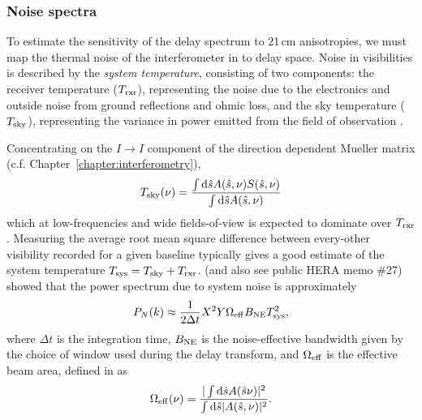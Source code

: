 \subsubsection{Noise spectra}

To estimate the sensitivity of the delay spectrum to 21\,cm anisotropies, we must map the thermal noise of the interferometer in to delay space. Noise in visibilities is described by the \textit{system temperature}, consisting of two components: the receiver temperature ($T_{\rm rxr}$), representing the noise due to the electronics and outside noise from ground reflections and ohmic loss, and the sky temperature ($T_{\rm sky}$), representing the variance in power emitted from the field of observation \citep{TMS}.

Concentrating on the $I\rightarrow I$ component of the direction dependent Mueller matrix (c.f. Chapter~\ref{chapter:interferometry}), 
\begin{equation}
T_{\rm sky}(\nu) = \frac{\int {\rm d}\hat{s} A(\hat{s},\nu) S(\hat{s},\nu) }{\int {\rm d}\hat{s} A(\hat{s},\nu)}
\end{equation}
which at low-frequencies and wide fields-of-view is expected to dominate over $T_{\rm rxr}$. Measuring the average root mean square difference between every-other visibility recorded for a given baseline typically gives a good estimate of the system temperature $T_{\rm sys} = T_{\rm sky} + T_{\rm rxr}$. \cite{Parsons.12b} (and also see public HERA memo \#27) showed that the power spectrum due to system noise is approximately
\begin{equation}
P_N(k) \approx \frac{1}{2\Delta t} X^2 Y \Omega_{\rm eff} B_{\rm NE} T_{\rm sys}^2,
\end{equation}
where $\Delta t$ is the integration time, $B_{\rm NE}$ is the noise-effective bandwidth given by the choice of window used during the delay transform, and $\Omega_{\rm eff}$ is the effective beam area, defined in \cite{Parsons.14} as
\begin{equation}
\Omega_{\rm eff}(\nu) = \frac{| \int {\rm d}\hat{s} A(\hat{s}\nu) |^2}{\int {\rm d}\hat{s} | A(\hat{s},\nu) |^2 }.
\end{equation}

